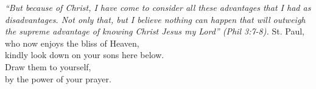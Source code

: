 \pagestyle{empty}
\hspace{0pt}
\vfill

\textit{``But because of Christ, I have come to consider all these
advantages that I had as disadvantages. Not only that, but I believe
nothing can happen that will outweigh the supreme advantage of
knowing Christ Jesus my Lord'' (Phil 3:7-8).}
\medbreak
\noindent St. Paul, who now enjoys the bliss of Heaven,\\
kindly look down on your sons here below.\\
Draw them to yourself,\\
by the power of your prayer.
\vfill
\hspace{0pt}
\newpage
